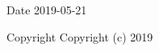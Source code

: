 \begin{DoxyDate}{Date}
2019-\/05-\/21
\end{DoxyDate}
\begin{DoxyCopyright}{Copyright}
Copyright (c) 2019 
\end{DoxyCopyright}
